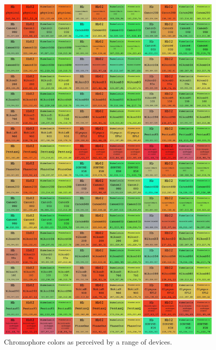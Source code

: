 



\begin{figure}[h!] %
  \centering
    \includegraphics[width=0.99\textwidth]{Chapter1/Figs/CameraComparison.jpg}
    \caption{Chromophore colors as perceived by a range of devices.}  \label{fig:CameraComparison}
\end{figure}

